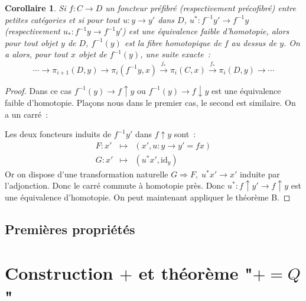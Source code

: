 \documentclass{amsart}
\theoremstyle{plain}
\newtheorem{coro}[theo]{Corollaire}
\theoremstyle{definition}
\theoremstyle{remark}
\newcommand{\id}{\mathrm{id}}
\newcommand{\ra}{\rightarrow}
\begin{document}
\begin{coro}
  Si $f:C\ra D$ un foncteur préfibré (respectivement précofibré) entre petites catégories et si pour tout $u:y\ra y'$ dans $D$,
  $u^*:f^{-1} y'\ra f^{-1} y$ (respectivement $u_*:f^{-1} y\ra f^{-1} y'$)
  est une équivalence faible d'homotopie, alors pour tout objet $y$ de $D$, $f^{-1}(y)$ est la fibre homotopique de $f$ au dessus de $y$.
  On a alors, pour tout $x$ objet de $f^{-1}(y)$, une suite exacte~:
  $$\dotsb\ra \pi_{i+1}(D,y)\ra \pi_{i}(f^{-1} y,x)\overset{j_*}{\ra} \pi_{i}(C,x)\overset{f_*}{\ra} \pi_{i}(D,y)\ra \dotsb$$
\end{coro}
\begin{proof}
  Dans ce cas $f^{-1}(y)\ra f\uparrow y$ ou $f^{-1}(y)\ra f\downarrow y$ est une équivalence faible d'homotopie. Plaçons nous dans 
  le premier cas, le second est similaire. On a un carré~:
  \begin{center}
  \end{center}
  Les deux foncteurs induits de $f^{-1}y'$ dans $f\uparrow y$ sont~:
  \[
    \begin{array}{lcl}
      F:x'&\mapsto& (x',u: y\ra y'=fx)\\
      G:x'&\mapsto& (u^*x',\id_y)             
    \end{array}
  \]
  Or on dispose d'une transformation naturelle $G\Rightarrow F,\; u^*x'\ra x'$ induite par l'adjonction.
  Donc le carré commute à homotopie près. Donc $u^*:f\uparrow y'\ra f\uparrow y$ est une équivalence d'homotopie. On peut maintenant appliquer le théorème B.
\end{proof}

\subsection{Premières propriétés}\label{premieresprops}

\section{\texorpdfstring{Construction $+$ et théorème "$+=Q$"}{Construction + et théorème "+=Q"}}
\end{document}
